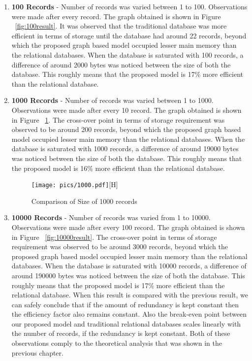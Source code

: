 \documentclass[12pt, oneside]{book}
\begin{document}
\begin{enumerate}
 \item \textbf{100 Records} - Number of records was varied between 1 to 100. Observations were made after every record. The graph obtained is shown in Figure ~\ref{fig:100result}. It was observed that the traditional database was more efficient in terms of storage until the database had around 22 records, beyond which the proposed graph based model occupied lesser main memory than the relational databases. When the database is saturated with 100 records, a difference of around 2000 bytes was noticed between the size of both the database. This roughly means that the proposed model is 17\% more efficient than the relational database.
  \item \textbf{1000 Records} - Number of records was varied between 1 to 1000. Observations were made after every 10 record. The graph obtained is shown in Figure ~\ref{fig:1000result}. The cross-over point in terms of storage requirement was observed to be around 200 records, beyond which the proposed graph based model occupied lesser main memory than the relational databases. When the database is saturated with 1000 records, a difference of around 19000 bytes was noticed between the size of both the database. This roughly means that the proposed model is 16\% more efficient than the relational database.
 \begin{figure}[H]
  \begin{center}
   \texttt{[image: pics/1000.pdf]}[H]
   \caption{Comparison of Size of 1000 records}
   \label{fig:1000result}
  \end{center}
 \end{figure}
  \item \textbf{10000 Records} - Number of records was varied from 1 to 10000. Observations were made after every 100 record. The graph obtained is shown in Figure ~\ref{fig:10000result}. The cross-over point in terms of storage requirement was observed to be around 3000 records, beyond which the proposed graph based model occupied lesser main memory than the relational databases. When the database is saturated with 10000 records, a difference of around 190000 bytes was noticed between the size of both the database. This roughly means that the proposed model is 17\% more efficient than the relational database. When this result is compared with the previous result, we can safely conclude that if the amount of redundancy is kept constant then the efficiency factor also remains constant. Also the break-even point between our proposed model and traditional relational databases scales linearly with the number of records, if the redundancy is kept constant. Both of these observations comply to the theoretical analysis that was shown in the previous chapter.

\end{enumerate}
\end{document}
